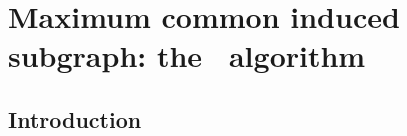 \chapter{Maximum common induced subgraph: the \McSplit\ algorithm}
\label{c:mcsplit-i-undirected}

\newcommand{\BigO}[1]{\ensuremath{\operatorname{O}\left(#1\right)}}

\newcommand{\exampleG} {
    \tikz {
        \graph [nodes={draw, circle, minimum width=.55cm, inner sep=1pt}, circular placement, radius=0.95cm,
                clockwise=5] {
                    1,2,3,4,5;
            1--4; 1--5; 2--3; 2--5; 3--5;
        };
    }
}
\newcommand{\exampleH} {
    \tikz {
        \graph [nodes={draw, circle, minimum width=.55cm, inner sep=1pt}, circular placement, radius=0.95cm,
                clockwise=6, phase=60] {
                    a,b,c,d,e,f;
            a--b; a--c; a--e; b--d; b--f; c--d; c--e; c--f; d--f; e--f;
        };
    }
}

\newcommand{\LabelTables}[3] {
  {\small
    \centering
    \begin{minipage}[t]{.20\linewidth}
        Mapping

        \medskip

        #1
    \end{minipage}
    \quad
    \begin{minipage}[t]{0.31\linewidth}
        \centering
        Labelling of $\graphG$

        \begin{tabular}[t]{cc}
        \toprule
            Vertex & Label\\
        \midrule
            #2
        \bottomrule
        \end{tabular}
    \end{minipage}
    \quad
    \begin{minipage}[t]{0.31\linewidth}
        \centering
        Labelling of $\graphH$

        \begin{tabular}[t]{cc}
        \toprule
            Vertex & Label\\
        \midrule
            #3
        \bottomrule
        \end{tabular}
        \medskip
    \end{minipage}
  }
}


\section{Introduction}

